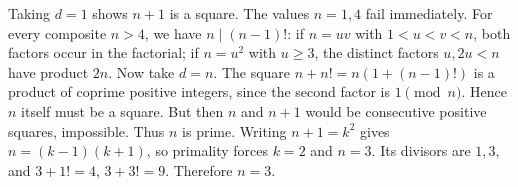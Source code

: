 Taking $d=1$ shows $n+1$ is a square. The values $n=1,4$ fail immediately. For every composite $n>4$, we have $n\mid(n-1)!$: if $n=uv$ with $1<u<v<n$, both factors occur in the factorial; if $n=u^2$ with $u\ge3$, the distinct factors $u,2u<n$ have product $2n$.
Now take $d=n$. The square $n+n!=n(1+(n-1)!)$ is a product of coprime positive integers, since the second factor is $1\pmod n$. Hence $n$ itself must be a square. But then $n$ and $n+1$ would be consecutive positive squares, impossible.
Thus $n$ is prime. Writing $n+1=k^2$ gives $n=(k-1)(k+1)$, so primality forces $k=2$ and $n=3$. Its divisors are $1,3$, and $3+1!=4$, $3+3!=9$. Therefore $\boxed{n=3}$.
